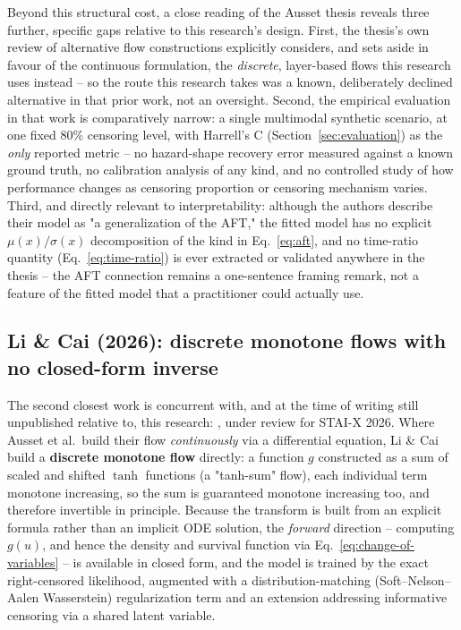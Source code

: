 \documentclass[11pt]{article}
\begin{document}
Beyond this structural cost, a close reading of the Ausset thesis reveals
three further, specific gaps relative to this research's design. First,
the thesis's own review of alternative flow constructions explicitly
considers, and sets aside in favour of the continuous formulation, the
\emph{discrete}, layer-based flows this research uses instead -- so the
route this research takes was a known, deliberately declined alternative
in that prior work, not an oversight. Second, the empirical evaluation in
that work is comparatively narrow: a single multimodal synthetic
scenario, at one fixed 80\% censoring level, with Harrell's C
(Section~\ref{sec:evaluation}) as the \emph{only} reported metric -- no
hazard-shape recovery error measured against a known ground truth, no
calibration analysis of any kind, and no controlled study of how
performance changes as censoring proportion or censoring mechanism
varies. Third, and directly relevant to interpretability: although the
authors describe their model as "a generalization of the AFT," the
fitted model has no explicit $\mu(x)/\sigma(x)$ decomposition of the kind
in Eq.~\eqref{eq:aft}, and no time-ratio quantity
(Eq.~\eqref{eq:time-ratio}) is ever extracted or validated anywhere in
the thesis -- the AFT connection remains a one-sentence framing remark,
not a feature of the fitted model that a practitioner could actually use.

\subsection{Li \& Cai (2026): discrete monotone flows with no closed-form inverse}
\label{sec:licai}

The second closest work is concurrent with, and at the time of writing
still unpublished relative to, this research: \citet{licai2026}, under
review for STAI-X 2026. Where Ausset et al.\ build their flow
\emph{continuously} via a differential equation, Li \& Cai build a
\textbf{discrete monotone flow} directly: a function $g$ constructed as a
sum of scaled and shifted $\tanh$ functions (a "tanh-sum" flow), each
individual term monotone increasing, so the sum is guaranteed monotone
increasing too, and therefore invertible in principle. Because the
transform is built from an explicit formula rather than an implicit ODE
solution, the \emph{forward} direction -- computing $g(u)$, and hence the
density and survival function via
Eq.~\eqref{eq:change-of-variables} -- is available in closed form,
and the model is trained by the exact right-censored likelihood, augmented
with a distribution-matching (Soft--Nelson--Aalen Wasserstein)
regularization term and an extension addressing informative censoring
via a shared latent variable.
\end{document}
